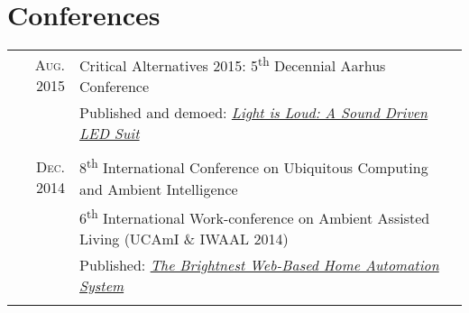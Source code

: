 \documentclass[letterpaper,10pt]{article}
\begin{document}
\section{Conferences}
\begin{tabular}{R|B}
	\textsc{Aug.} 2015 & Critical Alternatives 2015: 5\textsuperscript{th} Decennial Aarhus Conference                        \\
	                   & \small Published and demoed: \href{https://doi.org/10.7146/aahcc.v1i1.21320}
	{\emph{Light is Loud: A Sound Driven LED Suit}}                                                                           \\
	                                                                                                      \\

	\textsc{Dec.} 2014 & 8\textsuperscript{th} International Conference on Ubiquitous Computing and Ambient Intelligence      \\
	                   & 6\textsuperscript{th} International Work-conference on Ambient Assisted Living (UCAmI \& IWAAL 2014) \\
	                   & \small Published: \href{https://doi.org/10.1007/978-3-319-13102-3_14}
	{\emph{The Brightnest Web-Based Home Automation System}}                                                                  \\
	                                                                                                      \\
\end{tabular}


\end{document}
